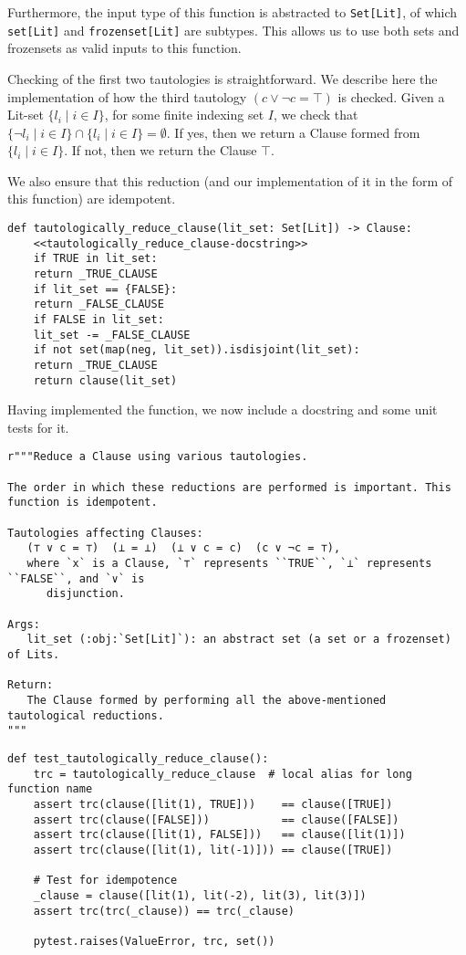 \documentclass[11pt]{article}
\begin{document}
Furthermore, the input type of this function is abstracted to \texttt{Set[Lit]},
of which \texttt{set[Lit]} and \texttt{frozenset[Lit]} are subtypes. This allows us to
use both sets and frozensets as valid inputs to this function.

Checking of the first two tautologies is straightforward. We describe here
the implementation of how the third tautology \((c \vee \neg c = \top)\) is
checked. Given a Lit-set \(\{l_i \mid i \in I\}\), for some finite indexing
set \(I\), we check that \(\{\neg l_i \mid i\in I\} \cap \{l_i \mid i\in
I\} = \emptyset\). If yes, then we return a Clause formed from \(\{l_i\mid
i\in I\}\). If not, then we return the Clause \(\top\).

We also ensure that this reduction (and our implementation of it in the
form of this function) are idempotent.

\begin{verbatim}
def tautologically_reduce_clause(lit_set: Set[Lit]) -> Clause:
    <<tautologically_reduce_clause-docstring>>
    if TRUE in lit_set:
	return _TRUE_CLAUSE
    if lit_set == {FALSE}:
	return _FALSE_CLAUSE
    if FALSE in lit_set:
	lit_set -= _FALSE_CLAUSE
    if not set(map(neg, lit_set)).isdisjoint(lit_set):
	return _TRUE_CLAUSE
    return clause(lit_set)
\end{verbatim}

Having implemented the function, we now include a docstring and some unit
tests for it.

\begin{verbatim}
r"""Reduce a Clause using various tautologies.

The order in which these reductions are performed is important. This function is idempotent.

Tautologies affecting Clauses:
   (⊤ ∨ c = ⊤)  (⊥ = ⊥)  (⊥ ∨ c = c)  (c ∨ ¬c = ⊤),
   where `x` is a Clause, `⊤` represents ``TRUE``, `⊥` represents ``FALSE``, and `∨` is
      disjunction.

Args:
   lit_set (:obj:`Set[Lit]`): an abstract set (a set or a frozenset) of Lits.

Return:
   The Clause formed by performing all the above-mentioned tautological reductions.
"""
\end{verbatim}

\begin{verbatim}
def test_tautologically_reduce_clause():
    trc = tautologically_reduce_clause  # local alias for long function name
    assert trc(clause([lit(1), TRUE]))    == clause([TRUE])
    assert trc(clause([FALSE]))           == clause([FALSE])
    assert trc(clause([lit(1), FALSE]))   == clause([lit(1)])
    assert trc(clause([lit(1), lit(-1)])) == clause([TRUE])

    # Test for idempotence
    _clause = clause([lit(1), lit(-2), lit(3), lit(3)])
    assert trc(trc(_clause)) == trc(_clause)

    pytest.raises(ValueError, trc, set())
\end{verbatim}
\end{document}
